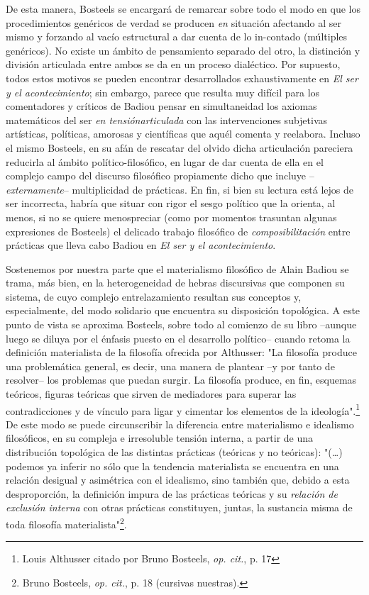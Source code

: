 \documentclass{book}
\begin{document}
De esta manera, Bosteels se encargará de remarcar sobre todo el modo en
que los procedimientos genéricos de verdad se producen \emph{en}
situación afectando al ser mismo y forzando al vacío estructural a dar
cuenta de lo in-contado (múltiples genéricos). No existe un ámbito de
pensamiento separado del otro, la distinción y división articulada entre
ambos se da en un proceso dialéctico. Por supuesto, todos estos motivos
se pueden encontrar desarrollados exhaustivamente en \emph{El ser y el
acontecimiento}; sin embargo, parece que resulta muy difícil para los
comentadores y críticos de Badiou pensar en simultaneidad los axiomas
matemáticos del ser \emph{en tensiónarticulada} con las intervenciones
subjetivas artísticas, políticas, amorosas y científicas que aquél
comenta y reelabora. Incluso el mismo Bosteels, en su afán de rescatar
del olvido dicha articulación pareciera reducirla al ámbito
político-filosófico, en lugar de dar cuenta de ella en el complejo campo
del discurso filosófico propiamente dicho que incluye
--\emph{externamente}-- multiplicidad de prácticas. En fin, si bien su
lectura está lejos de ser incorrecta, habría que situar con rigor el
sesgo político que la orienta, al menos, si no se quiere menospreciar
(como por momentos trasuntan algunas expresiones de Bosteels) el
delicado trabajo filosófico de \emph{composibilitación} entre prácticas
que lleva cabo Badiou en \emph{El ser y el acontecimiento}.

Sostenemos por nuestra parte que el materialismo filosófico de Alain
Badiou se trama, más bien, en la heterogeneidad de hebras discursivas
que componen su sistema, de cuyo complejo entrelazamiento resultan sus
conceptos y, especialmente, del modo solidario que encuentra su
disposición topológica. A este punto de vista se aproxima Bosteels,
sobre todo al comienzo de su libro --aunque luego se diluya por el
énfasis puesto en el desarrollo político-- cuando retoma la definición
materialista de la filosofía ofrecida por Althusser: "La filosofía
produce una problemática general, es decir, una manera de plantear --y
por tanto de resolver-- los problemas que puedan surgir. La filosofía
produce, en fin, esquemas teóricos, figuras teóricas que sirven de
mediadores para superar las contradicciones y de vínculo para ligar y
cimentar los elementos de la ideología".\footnote{Louis Althusser citado
  por Bruno Bosteels, \emph{op. cit.}, p. 17} De este modo se puede
circunscribir la diferencia entre materialismo e idealismo filosóficos,
en su compleja e irresoluble tensión interna, a partir de una
distribución topológica de las distintas prácticas (teóricas y no
teóricas): "(\dots) podemos ya inferir no sólo que la tendencia
materialista se encuentra en una relación desigual y asimétrica con el
idealismo, sino también que, debido a esta desproporción, la definición
impura de las prácticas teóricas y su \emph{relación de exclusión
interna} con otras prácticas constituyen, juntas, la sustancia misma de
toda filosofía materialista"\footnote{Bruno Bosteels, \emph{op. cit.},
  p. 18 (cursivas nuestras).}.
\end{document}
